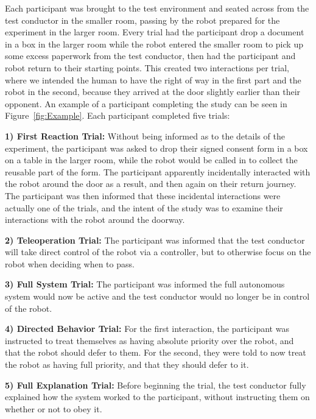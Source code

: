 \documentclass[letterpaper, 10 pt, conference]{ieeeconf}  %
\begin{document}
Each participant was brought to the test environment and seated across from the test conductor in the smaller room, passing by the robot prepared for the experiment in the larger room. Every trial had the participant drop a document in a box in the larger room while the robot entered the smaller room to pick up some excess paperwork from the test conductor, then had the participant and robot return to their starting points. This created two interactions per trial, where we intended the human to have the right of way in the first part and the robot in the second, because they arrived at the door slightly earlier than their opponent. An example of a participant completing the study can be seen in Figure~\ref{fig:Example}. Each participant completed five trials:

\textbf{1) First Reaction Trial:} Without being informed as to the details of the experiment, the participant was asked to drop their signed consent form in a box on a table in the larger room, while the robot would be called in to collect the reusable part of the form. The participant apparently incidentally interacted with the robot around the door as a result, and then again on their return journey. The participant was then informed that these incidental interactions were actually one of the trials, and the intent of the study was to examine their interactions with the robot around the doorway.

\textbf{2) Teleoperation Trial:} The participant was informed that the test conductor will take direct control of the robot via a controller, but to otherwise focus on the robot when deciding when to pass. 

\textbf{3) Full System Trial:} The participant was informed the full autonomous system would now be active and the test conductor would no longer be in control of the robot.

\textbf{4) Directed Behavior Trial:} For the first interaction, the participant was instructed to treat themselves as having absolute priority over the robot, and that the robot should defer to them. For the second, they were told to now treat the robot as having full priority, and that they should defer to it.

\textbf{5) Full Explanation Trial:} Before beginning the trial, the test conductor fully explained how the system worked to the participant, without instructing them on whether or not to obey it.%
\end{document}
